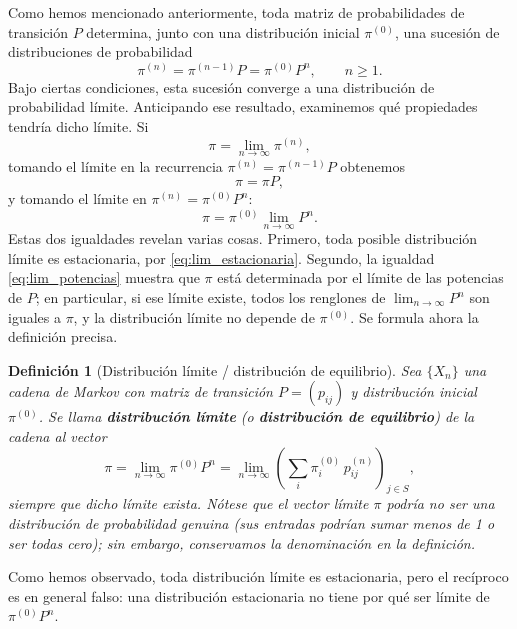 \documentclass[12pt]{book}
\newtheorem{definition}{Definición}[chapter]
\begin{document}
Como hemos mencionado anteriormente, toda matriz de probabilidades de transición $P$ determina, junto con una distribución inicial $\pi^{(0)}$, una sucesión de distribuciones de probabilidad
\[
    \pi^{(n)} = \pi^{(n-1)}P = \pi^{(0)}P^n, \qquad n \ge 1.
\]
Bajo ciertas condiciones, esta sucesión converge a una distribución de probabilidad límite. Anticipando ese resultado, examinemos qué propiedades tendría dicho límite. Si
\[
    \pi = \lim_{n\to\infty} \pi^{(n)},
\]
tomando el límite en la recurrencia $\pi^{(n)} = \pi^{(n-1)}P$ obtenemos
\begin{equation}\label{eq:lim_estacionaria}
    \pi = \pi P,
\end{equation}
y tomando el límite en $\pi^{(n)} = \pi^{(0)}P^n$:
\begin{equation}\label{eq:lim_potencias}
    \pi = \pi^{(0)} \lim_{n\to\infty} P^n.
\end{equation}
Estas dos igualdades revelan varias cosas. Primero, toda posible distribución límite es estacionaria, por \eqref{eq:lim_estacionaria}. Segundo, la igualdad \eqref{eq:lim_potencias} muestra que $\pi$ está determinada por el límite de las potencias de $P$; en particular, si ese límite existe, todos los renglones de $\lim_{n\to\infty} P^n$ son iguales a $\pi$, y la distribución límite no depende de $\pi^{(0)}$. Se formula ahora la definición precisa.

\begin{definition}[Distribución límite / distribución de equilibrio]
    Sea $\{X_n\}$ una cadena de Markov con matriz de transición $P = (p_{ij})$ y distribución inicial $\pi^{(0)}$. Se llama \textbf{distribución límite} (o \textbf{distribución de equilibrio}) de la cadena al vector
    \[
        \pi = \lim_{n\to\infty} \pi^{(0)} P^n = \lim_{n\to\infty}\left(\sum_i \pi^{(0)}_i\, p_{ij}^{(n)}\right)_{j\in S},
    \]
    siempre que dicho límite exista. Nótese que el vector límite $\pi$ podría no ser una distribución de probabilidad genuina (sus entradas podrían sumar menos de 1 o ser todas cero); sin embargo, conservamos la denominación en la definición.
\end{definition}

Como hemos observado, toda distribución límite es estacionaria, pero el recíproco es en general falso: una distribución estacionaria no tiene por qué ser límite de $\pi^{(0)}P^n$.
\end{document}
